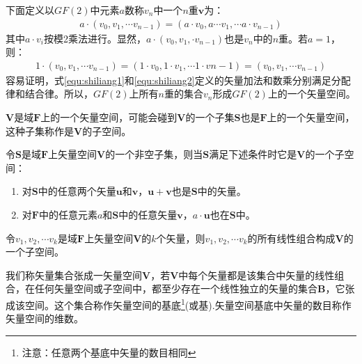 下面定义以$GF(2)$中元素$a$数称$v_n$中一个$n$重$\mathbf{v}$为：
\begin{eqnarray}
  a\cdot(v_0,v_1,\cdots v_{n-1})=(a\cdot v_0,a\cdots v_1,\cdots a\cdot
  v_{n-1})
  \label{equ:shiliang2}
\end{eqnarray}
其中$a\cdot v_i$按模2乘法进行。显然，$a\cdot(v_0,v_1,\cdot
v_{n-1})$也是$v_n$中的$n$重。若$a=1$，则：
\begin{eqnarray}
  1\cdot(v_0,v_1,\cdots v_{n-1})=(1\cdot v_0,1\cdot v_1,\cdots 1\cdot
  v{n-1})=(v_0,v_1,\cdots v_{n-1})
  \label{equ:shiliang3}
\end{eqnarray}
容易证明，式\ref{equ:shiliang1}和\ref{equ:shiliang2}定义的矢量加法和数乘分别满足分配律和结合律。所以，$GF(2)$上所有$n$重的集合$v_n$形成$GF(2)$上的一个矢量空间。

$\mathbf{V}$是域$\mathbf{F}$上的一个矢量空间，可能会碰到$\mathbf{V}$的一个子集$\mathbf{S}$也是$\mathbf{F}$上的一个矢量空间，这种子集称作是$\mathbf{V}$的子空间。

\begin{ioatheorem}
  令$\mathbf{S}$是域$\mathbf{F}$上矢量空间$\mathbf{V}$的一个非空子集，则当$\mathbf{S}$满足下述条件时它是$\mathbf{V}$的一个子空间：
  \label{theorem:2.7}
  \begin{enumerate}
    \item
      对$\mathbf{S}$中的任意两个矢量$\mathbf{u}$和$\mathbf{v}$，$\mathbf{u}+\mathbf{v}$也是$\mathbf{S}$中的矢量。
    \item
      对$\mathbf{F}$中的任意元素$a$和$\mathbf{S}$中的任意矢量$\mathbf{v}$，$a\cdot\mathbf{u}$也在$\mathbf{S}$中。
  \end{enumerate}
  \label{}
\end{ioatheorem}
\begin{ioatheorem}
  令$v_1,v_2,\cdots
  v_k$是域$\mathbf{F}$上矢量空间$\mathbf{V}$的$k$个矢量，则$v_1,v_2,\cdots
  v_k$的所有线性组合构成$\mathbf{V}$的一个子空间。
  \label{theorem:2.8}
\end{ioatheorem}

我们称矢量集合张成一矢量空间$\mathbf{V}$，若$\mathbf{V}$中每个矢量都是该集合中矢量的线性组合，在任何矢量空间或子空间中，都至少存在一个线性独立的矢量的集合$\mathbf{B}$，它张成该空间。这个集合称作矢量空间的基底\footnote{注意：任意两个基底中矢量的数目相同}(或基).矢量空间基底中矢量的数目称作矢量空间的维数。

